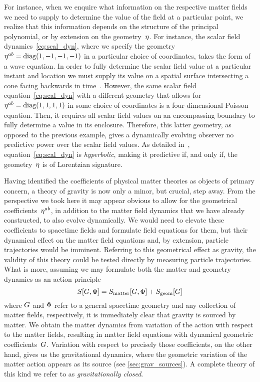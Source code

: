 For instance, when we enquire what information on the respective matter fields we need to supply to determine the value of the field at a particular point, we realize that this information depends on the structure of the principal polynomial, or by extension on the geometry~$\eta$. For instance, the scalar field dynamics~\eqref{eq:scal_dyn}, where we specify the geometry~$\eta^{ab}=\mathrm{diag}(1,-1,-1,-1)$ in a particular choice of coordinates, takes the form of a wave equation. In order to fully determine the scalar field value at a particular instant and location we must supply its value on a spatial surface intersecting a cone facing backwards in time~\autocite{DispRel2011}. However, the same scalar field equation~\eqref{eq:scal_dyn} with a different geometry that allows for $\eta^{ab}=\mathrm{diag}(1,1,1,1)$ in some choice of coordinates is a four-dimensional Poisson equation. Then, it requires all scalar field values on an encompassing boundary to fully determine a value in its enclosure. Therefore, this latter geometry, as opposed to the previous example, gives a dynamically evolving observer no predictive power over the scalar field values. As detailed in~\autocite{DispRel2011}, equation~\eqref{eq:scal_dyn} is \emph{hyperbolic}, making it predictive if, and only if, the geometry~$\eta$ is of Lorentzian signature.

Having identified the coefficients of physical matter theories as objects of primary concern, a theory of gravity is now only a minor, but crucial, step away. From the perspective we took here it may appear obvious to allow for the geometrical coefficients~$\eta^{ab}$, in addition to the matter field dynamics that we have already constructed, to also evolve dynamically. We would need to elevate these coefficients to spacetime fields and formulate field equations for them, but their dynamical effect on the matter field equations and, by extension, particle trajectories would be imminent. Referring to this geometrical effect as gravity, the validity of this theory could be tested directly by measuring particle trajectories. What is more, assuming we may formulate both the matter and geometry dynamics as an action principle
\begin{equation}\label{eq:act_full}
	S[G,\Phi]=S_\mathrm{matter}[G,\Phi]+S_\mathrm{geom}[G]
\end{equation}
where $G$ and $\Phi$ refer to a general spacetime geometry and any collection of matter fields, respectively, it is immediately clear that gravity is sourced by matter. We obtain the matter dynamics from variation of the action with respect to the matter fields, resulting in matter field equations with dynamical geometric coefficients~$G$. Variation with respect to precisely those coefficients, on the other hand, gives us the gravitational dynamics, where the geometric variation of the matter action appears as its source (see \autoref{sec:grav_sources}). A complete theory of this kind we refer to as \emph{gravitationally closed}.

